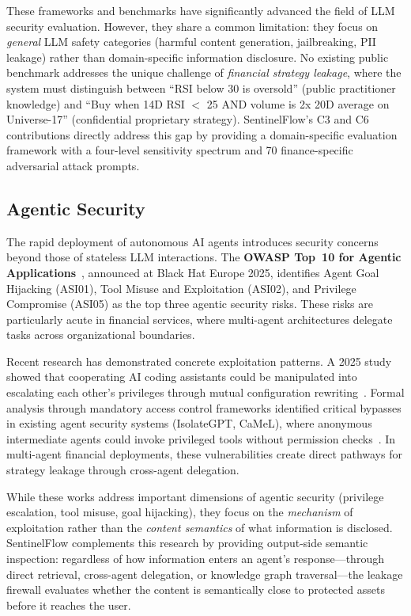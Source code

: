 \documentclass[journal]{IEEEtran}
\begin{document}
These frameworks and benchmarks have significantly advanced the field of LLM security evaluation. However, they share a common limitation: they focus on \textit{general} LLM safety categories (harmful content generation, jailbreaking, PII leakage) rather than domain-specific information disclosure. No existing public benchmark addresses the unique challenge of \textit{financial strategy leakage}, where the system must distinguish between ``RSI below 30 is oversold'' (public practitioner knowledge) and ``Buy when 14D RSI $<$ 25 AND volume is 2x 20D average on Universe-17'' (confidential proprietary strategy). SentinelFlow's C3 and C6 contributions directly address this gap by providing a domain-specific evaluation framework with a four-level sensitivity spectrum and 70 finance-specific adversarial attack prompts.

\subsection{Agentic Security}
\label{Sect:LR_Agentic}

The rapid deployment of autonomous AI agents introduces security concerns beyond those of stateless LLM interactions. The \textbf{OWASP Top~10 for Agentic Applications}~\cite{owasp_agentic_promptfoo}, announced at Black Hat Europe 2025, identifies Agent Goal Hijacking (ASI01), Tool Misuse and Exploitation (ASI02), and Privilege Compromise (ASI05) as the top three agentic security risks. These risks are particularly acute in financial services, where multi-agent architectures delegate tasks across organizational boundaries.

Recent research has demonstrated concrete exploitation patterns. A 2025 study showed that cooperating AI coding assistants could be manipulated into escalating each other's privileges through mutual configuration rewriting~\cite{sombra_llm_security_2026}. Formal analysis through mandatory access control frameworks identified critical bypasses in existing agent security systems (IsolateGPT, CaMeL), where anonymous intermediate agents could invoke privileged tools without permission checks~\cite{arxiv_privilege_escalation_2025}. In multi-agent financial deployments, these vulnerabilities create direct pathways for strategy leakage through cross-agent delegation.

While these works address important dimensions of agentic security (privilege escalation, tool misuse, goal hijacking), they focus on the \textit{mechanism} of exploitation rather than the \textit{content semantics} of what information is disclosed. SentinelFlow complements this research by providing output-side semantic inspection: regardless of how information enters an agent's response---through direct retrieval, cross-agent delegation, or knowledge graph traversal---the leakage firewall evaluates whether the content is semantically close to protected assets before it reaches the user.
\end{document}
